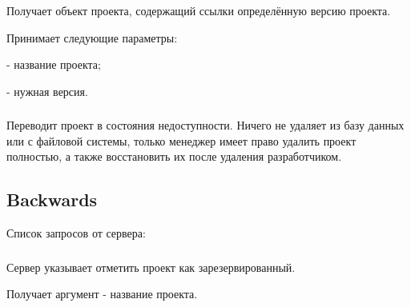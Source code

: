\subsubsection{}

Получает объект проекта, содержащий ссылки определённую версию проекта.

Принимает следующие параметры:

\begin{icItems}
	\item {} - название проекта;
	\item {} - нужная версия.
\end{icItems}

\subsubsection{}

Переводит проект в состояния недоступности. Ничего не удаляет из базу данных или с файловой системы, только менеджер имеет право удалить проект полностью, а также восстановить их после удаления разработчиком.

\subsection{Backwards}

Список запросов от сервера:
\begin{icItems}
	\item {}
	\item {}
	\item {}
	\item {}
	\item {}
\end{icItems}

\subsubsection{}

Сервер указывает отметить проект как зарезервированный.

Получает аргумент  - название проекта.

\subsubsection{}

